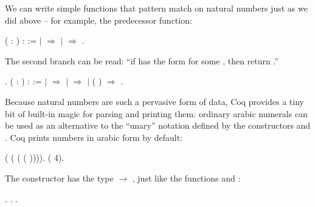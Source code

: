 \documentclass[12pt]{report}
\begin{document}
    We can write simple functions that pattern match on natural
    numbers just as we did above -- for example, the predecessor
    function: \begin{coqdoccode}
\coqdocemptyline
\coqdocnoindent
{}  ( : ) :  :=\coqdoceol
\coqdocindent{1.00em}
  \coqdoceol
\coqdocindent{2.00em}
\ensuremath{|}  \ensuremath{\Rightarrow} \coqdoceol
\coqdocindent{2.00em}
\ensuremath{|}   \ensuremath{\Rightarrow} \coqdoceol
\coqdocindent{1.00em}
.\coqdoceol
\coqdocemptyline
\end{coqdoccode}
The second branch can be read: ``if  has the form  
    for some , then return .''  \begin{coqdoccode}
\coqdocemptyline
\coqdocnoindent
{} .\coqdoceol
\coqdocemptyline
\coqdocnoindent
{}  ( : ) :  :=\coqdoceol
\coqdocindent{1.00em}
  \coqdoceol
\coqdocindent{2.00em}
\ensuremath{|}  \ensuremath{\Rightarrow} \coqdoceol
\coqdocindent{2.00em}
\ensuremath{|}   \ensuremath{\Rightarrow} \coqdoceol
\coqdocindent{2.00em}
\ensuremath{|}  ( ) \ensuremath{\Rightarrow} \coqdoceol
\coqdocindent{1.00em}
.\coqdoceol
\coqdocemptyline
\end{coqdoccode}
Because natural numbers are such a pervasive form of data,
    Coq provides a tiny bit of built-in magic for parsing and printing
    them: ordinary arabic numerals can be used as an alternative to
    the ``unary'' notation defined by the constructors  and .  Coq
    prints numbers in arabic form by default: \begin{coqdoccode}
\coqdocemptyline
\coqdocnoindent
{} ( ( ( ( )))).\coqdoceol
\coqdocnoindent
{}   ( 4).\coqdoceol
\coqdocemptyline
\end{coqdoccode}
The constructor  has the type  \ensuremath{\rightarrow} , just like the
    functions  and : \begin{coqdoccode}
\coqdocemptyline
\coqdocnoindent
{} .\coqdoceol
\coqdocnoindent
{} .\coqdoceol
\coqdocnoindent
{} .\coqdoceol
\coqdocemptyline
\end{coqdoccode}
\end{document}
